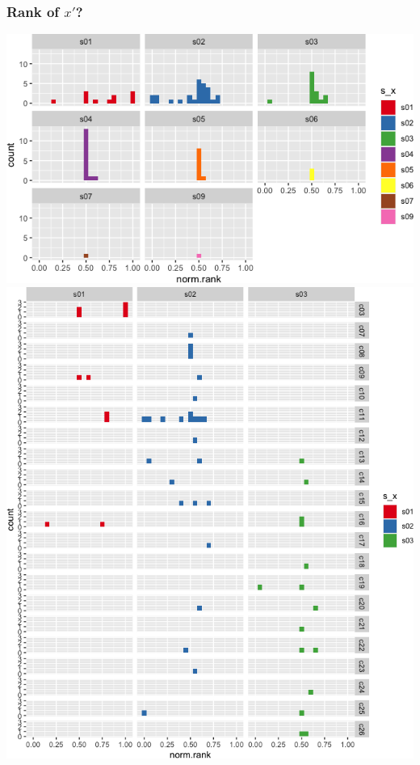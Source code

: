 \documentclass[
]{article}
\begin{document}
\hypertarget{rank-of-x-1}{%
\subsubsection{\texorpdfstring{Rank of
\(x'\)?}{Rank of x'?}}\label{rank-of-x-1}}

\includegraphics{vn_files/figure-latex/rank3-1.png}
\includegraphics{vn_files/figure-latex/rank4-1.png}
\end{document}
